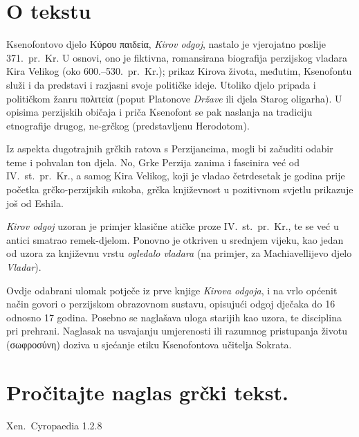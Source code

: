 


\section*{O tekstu}

Ksenofontovo djelo Κύρου παιδεία, \textit{Kirov odgoj}, nastalo je vjerojatno poslije 371.\ pr.~Kr. U osnovi, ono je fiktivna, romansirana biografija perzijskog vladara Kira Velikog (oko 600.–530.\ pr.~Kr.); prikaz Kirova života, međutim, Ksenofontu služi i da predstavi i razjasni svoje političke ideje. Utoliko djelo pripada i političkom žanru πολιτεία (poput Platonove \textit{Države} ili djela Starog oligarha). U opisima perzijskih običaja i priča Ksenofont se pak naslanja na tradiciju etnografije drugog, ne-grčkog (predstavljenu Herodotom). 

Iz aspekta dugotrajnih grčkih ratova s Perzijancima, mogli bi začuditi odabir teme i pohvalan ton djela. No, Grke Perzija zanima i fascinira već od IV.~st.\ pr.~Kr., a samog Kira Velikog, koji je vladao četrdesetak je godina prije početka grčko-perzijskih sukoba, grčka književnost u pozitivnom svjetlu prikazuje još od Eshila. 

\textit{Kirov odgoj} uzoran je primjer klasične atičke proze IV.~st.\ pr.~Kr., te se već u antici smatrao remek-djelom. Ponovno je otkriven u srednjem vijeku, kao jedan od uzora za književnu vrstu \textit{ogledalo vladara} (na primjer, za Machiavellijevo djelo \textit{Vladar}). 

Ovdje odabrani ulomak potječe iz prve knjige \textit{Kirova odgoja}, i na vrlo općenit način govori o perzijskom obrazovnom sustavu, opisujući odgoj dječaka do 16 odnosno 17 godina. Posebno se naglašava uloga starijih kao uzora, te disciplina pri prehrani. Naglasak na usvajanju umjerenosti ili razumnog pristupanja životu (σωφροσύνη) doziva u sjećanje etiku Ksenofontova učitelja Sokrata.

\newpage

\section*{Pročitajte naglas grčki tekst.}

Xen.\ Cyropaedia 1.2.8



